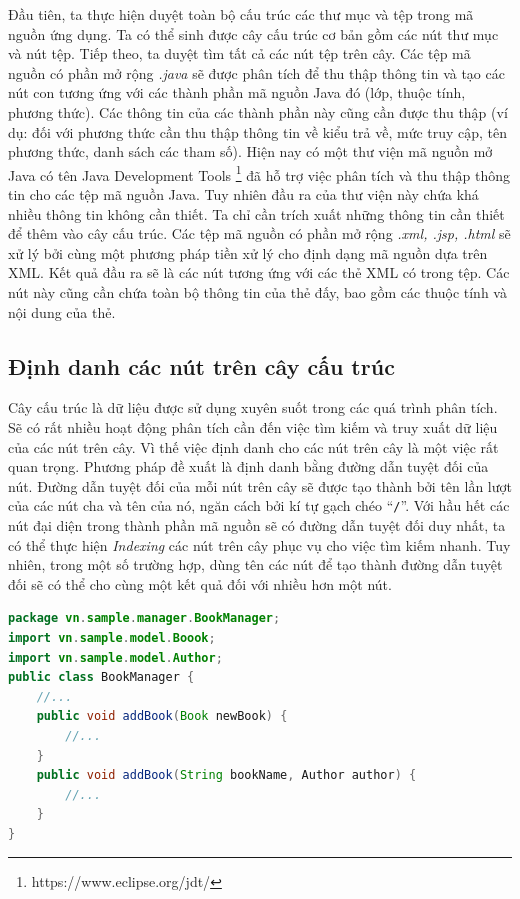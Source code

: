 \documentclass[12pt]{report}
\begin{document}
Đầu tiên, ta thực hiện duyệt toàn bộ cấu trúc các thư mục và tệp trong mã nguồn ứng dụng. Ta có thể sinh được cây cấu trúc cơ bản gồm các nút thư mục và nút tệp. Tiếp theo, ta duyệt tìm tất cả các nút tệp trên cây. Các tệp mã nguồn có phần mở rộng \textit{.java} sẽ được phân tích  để thu thập thông tin và tạo các nút con tương ứng với các thành phần mã nguồn Java đó (lớp, thuộc tính, phương thức). Các thông tin của các thành phần này cũng cần được thu thập (ví dụ: đối với phương thức cần thu thập thông tin về kiểu trả về, mức truy cập, tên phương thức, danh sách các tham số). Hiện nay có một thư viện mã nguồn mở Java có tên Java Development Tools \footnote{https://www.eclipse.org/jdt/} đã hỗ trợ việc phân tích và thu thập thông tin cho các tệp mã nguồn Java. Tuy nhiên đầu ra của thư viện này chứa khá nhiều thông tin không cần thiết. Ta chỉ cần trích xuất những thông tin cần thiết để thêm vào cây cấu trúc. Các tệp mã nguồn có phần mở rộng \textit{.xml, .jsp, .html} sẽ xử lý bởi cùng một phương pháp tiền xử lý cho định dạng mã nguồn dựa trên XML. Kết quả đầu ra sẽ là các nút tương ứng với các thẻ XML có trong tệp. Các nút này cũng cần chứa toàn bộ thông tin của thẻ đấy, bao gồm các thuộc tính và nội dung của thẻ.

\subsection{Định danh các nút trên cây cấu trúc}
Cây cấu trúc là dữ liệu được sử dụng xuyên suốt trong các quá trình phân tích. Sẽ có rất nhiều hoạt động phân tích cần đến việc tìm kiếm và truy xuất dữ liệu của các nút trên cây. Vì thế việc định danh cho các nút trên cây là một việc rất quan trọng. Phương pháp đề xuất là định danh bằng đường dẫn tuyệt đối của nút. Đường dẫn tuyệt đối của mỗi nút trên cây sẽ được tạo thành bởi tên lần lượt của các nút cha và tên của nó, ngăn cách bởi kí tự gạch chéo ``\texttt{/}''. Với hầu hết các nút đại diện trong thành phần mã nguồn sẽ có đường dẫn tuyệt đối duy nhất, ta có thể thực hiện \textit{Indexing} các nút trên cây phục vụ cho việc tìm kiếm nhanh. Tuy nhiên, trong một số trường hợp, dùng tên các nút để tạo thành đường dẫn tuyệt đối sẽ có thể cho cùng một kết quả đối với nhiều hơn một nút.

\begin{lstlisting}[language=Java,
caption={Ví dụ chồng hàm trong Java},label={code:java-overloading}]
package vn.sample.manager.BookManager;
import vn.sample.model.Boook;
import vn.sample.model.Author;
public class BookManager {
	//...	
	public void addBook(Book newBook) {
		//...
	}
	public void addBook(String bookName, Author author) {
		//...
	}
}
\end{lstlisting}
\end{document}
